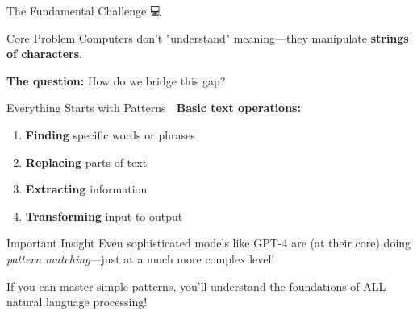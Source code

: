 \documentclass[aspectratio=169]{beamer}
\begin{document}
\begin{frame}[shrink=5]{The Fundamental Challenge 💻}
\begin{block}{Core Problem}
Computers don't "understand" meaning—they manipulate \textbf{strings of characters}.
\end{block}

\vspace{0.3cm}

\begin{center}
\end{center}

\vspace{0.3cm}

\textbf{The question:} How do we bridge this gap?
\end{frame}

\begin{frame}{Everything Starts with Patterns 🎯}
\small
\textbf{Basic text operations:}
\begin{enumerate}\setlength{\itemsep}{0pt}
    \item \textbf{Finding} specific words or phrases
    \item \textbf{Replacing} parts of text
    \item \textbf{Extracting} information
    \item \textbf{Transforming} input to output
\end{enumerate}

\vspace{0.3cm}

\begin{alertblock}{Important Insight}
Even sophisticated models like GPT-4 are (at their core) doing \textit{pattern matching}—just at a much more complex level!
\end{alertblock}

\vspace{0.3cm}

\begin{thinkaboutit}
If you can master simple patterns, you'll understand the foundations of ALL natural language processing!
\end{thinkaboutit}
\end{frame}
\end{document}
